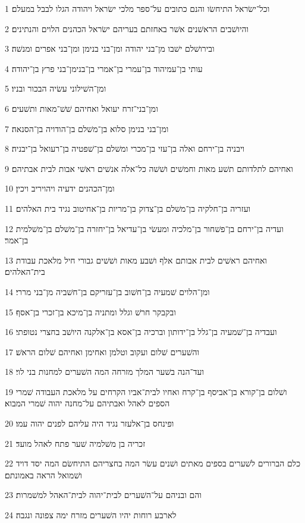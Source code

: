 \par 1 וכל־ישׂראל התיחשׂו והנם כתובים על־ספר מלכי ישׂראל ויהודה הגלו לבבל במעלם׃
\par 2 והיושׁבים הראשׁנים אשׁר באחזתם בעריהם ישׂראל הכהנים הלוים והנתינים׃
\par 3 ובירושׁלם ישׁבו מן־בני יהודה ומן־בני בנימן ומן־בני אפרים ומנשׁה׃
\par 4 עותי בן־עמיהוד בן־עמרי בן־אמרי בן־בנימן־בני פרץ בן־יהודה׃
\par 5 ומן־השׁילוני עשׂיה הבכור ובניו׃
\par 6 ומן־בני־זרח יעואל ואחיהם שׁשׁ־מאות ותשׁעים׃
\par 7 ומן־בני בנימן סלוא בן־משׁלם בן־הודויה בן־הסנאה׃
\par 8 ויבניה בן־ירחם ואלה בן־עזי בן־מכרי ומשׁלם בן־שׁפטיה בן־רעואל בן־יבניה׃
\par 9 ואחיהם לתלדותם תשׁע מאות וחמשׁים ושׁשׁה כל־אלה אנשׁים ראשׁי אבות לבית אבתיהם׃
\par 10 ומן־הכהנים ידעיה ויהויריב ויכין׃
\par 11 ועזריה בן־חלקיה בן־משׁלם בן־צדוק בן־מריות בן־אחיטוב נגיד בית האלהים׃
\par 12 ועדיה בן־ירחם בן־פשׁחור בן־מלכיה ומעשׂי בן־עדיאל בן־יחזרה בן־משׁלם בן־משׁלמית בן־אמר׃
\par 13 ואחיהם ראשׁים לבית אבותם אלף ושׁבע מאות ושׁשׁים גבורי חיל מלאכת עבודת בית־האלהים׃
\par 14 ומן־הלוים שׁמעיה בן־חשׁוב בן־עזריקם בן־חשׁביה מן־בני מררי׃
\par 15 ובקבקר חרשׁ וגלל ומתניה בן־מיכא בן־זכרי בן־אסף׃
\par 16 ועבדיה בן־שׁמעיה בן־גלל בן־ידותון וברכיה בן־אסא בן־אלקנה היושׁב בחצרי נטופתי׃
\par 17 והשׁערים שׁלום ועקוב וטלמן ואחימן ואחיהם שׁלום הראשׁ׃
\par 18 ועד־הנה בשׁער המלך מזרחה המה השׁערים למחנות בני לוי׃
\par 19 ושׁלום בן־קורא בן־אביסף בן־קרח ואחיו לבית־אביו הקרחים על מלאכת העבודה שׁמרי הספים לאהל ואבתיהם על־מחנה יהוה שׁמרי המבוא׃
\par 20 ופינחס בן־אלעזר נגיד היה עליהם לפנים יהוה עמו׃
\par 21 זכריה בן משׁלמיה שׁער פתח לאהל מועד׃
\par 22 כלם הברורים לשׁערים בספים מאתים ושׁנים עשׂר המה בחצריהם התיחשׂם המה יסד דויד ושׁמואל הראה באמונתם׃
\par 23 והם ובניהם על־השׁערים לבית־יהוה לבית־האהל למשׁמרות׃
\par 24 לארבע רוחות יהיו השׁערים מזרח ימה צפונה ונגבה׃
